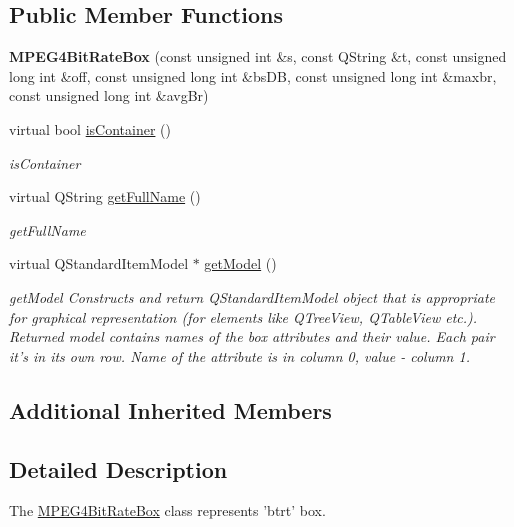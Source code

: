 \subsection*{Public Member Functions}
\begin{DoxyCompactItemize}
\item 
\hypertarget{class_m_p_e_g4_bit_rate_box_a32fc34caebc36046150263587a1dd83c}{{\bfseries M\-P\-E\-G4\-Bit\-Rate\-Box} (const unsigned int \&s, const Q\-String \&t, const unsigned long int \&off, const unsigned long int \&bs\-D\-B, const unsigned long int \&maxbr, const unsigned long int \&avg\-Br)}\label{class_m_p_e_g4_bit_rate_box_a32fc34caebc36046150263587a1dd83c}

\item 
virtual bool \hyperlink{class_m_p_e_g4_bit_rate_box_aafb5c5fe09ef9afbfe91e3cc5ce0ff5d}{is\-Container} ()
\begin{DoxyCompactList}\small\item\em is\-Container \end{DoxyCompactList}\item 
virtual Q\-String \hyperlink{class_m_p_e_g4_bit_rate_box_a5ee8e5653c4d5683e85c6b9f5b6746a1}{get\-Full\-Name} ()
\begin{DoxyCompactList}\small\item\em get\-Full\-Name \end{DoxyCompactList}\item 
virtual Q\-Standard\-Item\-Model $\ast$ \hyperlink{class_m_p_e_g4_bit_rate_box_aee967785d4fb16f784b5b6dffcd850a8}{get\-Model} ()
\begin{DoxyCompactList}\small\item\em get\-Model Constructs and return Q\-Standard\-Item\-Model object that is appropriate for graphical representation (for elements like Q\-Tree\-View, Q\-Table\-View etc.). Returned model contains names of the box attributes and their value. Each pair it's in its own row. Name of the attribute is in column 0, value -\/ column 1. \end{DoxyCompactList}\end{DoxyCompactItemize}
\subsection*{Additional Inherited Members}


\subsection{Detailed Description}
The \hyperlink{class_m_p_e_g4_bit_rate_box}{M\-P\-E\-G4\-Bit\-Rate\-Box} class represents 'btrt' box. 

